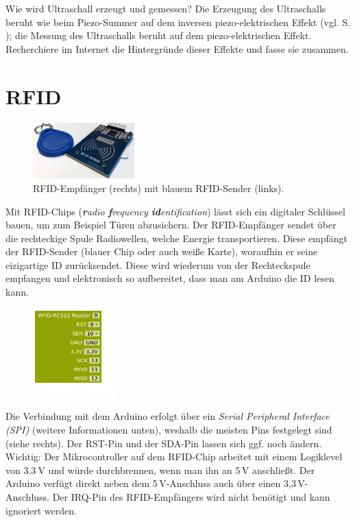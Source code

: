 \begin{recherche}{Wie wird Ultraschall erzeugt und gemessen?}
	Die Erzeugung des Ultraschalls beruht wie beim Piezo-Summer auf dem inversen piezo-elektrischen Effekt (vgl. S. \pageref{piezo-effekt}); die Messung des Ultraschalls beruht auf dem piezo-elektrischen Effekt. Recherchiere im Internet die Hintergründe dieser Effekte und fasse sie zusammen.
\end{recherche}




\newpage
\section{RFID}\label{sec:rfid}

\begin{figure}
	\centering
	\includegraphics[width=0.35\textwidth]{./pics/rfid.jpg}
	\caption{RFID-Empfänger (rechts) mit blauem RFID-Sender (links).}
\end{figure}
Mit RFID-Chips (\emph{\textbf{r}adio \textbf{f}requency \textbf{id}entification}) lässt sich ein digitaler Schlüssel bauen, um zum Beispiel Türen abzusichern. Der RFID-Empfänger sendet über die rechteckige Spule Radiowellen, welche Energie transportieren. Diese empfängt der RFID-Sender (blauer Chip oder auch weiße Karte), woraufhin er seine eizigartige ID zurücksendet. Diese wird wiederum von der Rechteckspule empfangen und elektronisch so aufbereitet, dass man am Arduino die ID lesen kann.

\begin{figure}
	\centering
	\vspace{-0.5\baselineskip}
	\includegraphics[width=0.28\textwidth]{./pics/rfid-konfiguration.png}
	\vspace{-0.5\baselineskip}
\end{figure}
Die Verbindung mit dem Arduino erfolgt über ein \emph{Serial Peripheral Interface (SPI)} (weitere Informationen unten), weshalb die meisten Pins festgelegt sind (siehe rechts). Der RST-Pin und der SDA-Pin lassen sich ggf. noch ändern. Wichtig: Der Mikrocontroller auf dem RFID-Chip arbeitet mit einem Logiklevel von $\SI{3,3}{\volt}$ und würde durchbrennen, wenn man ihn an 5\,V anschließt. Der Arduino verfügt direkt neben dem 5\,V-Anschluss auch über einen 3,3\,V-Anschluss. Der IRQ-Pin des RFID-Empfängers wird nicht benötigt und kann ignoriert werden.

